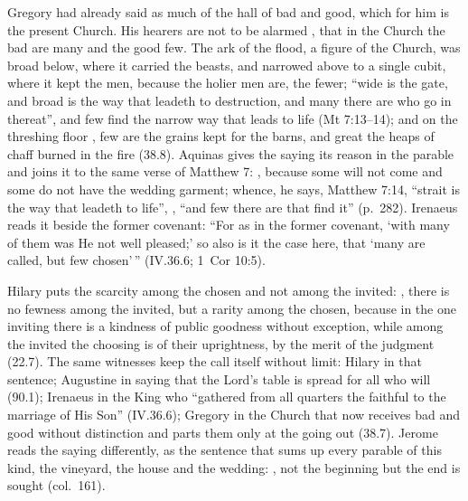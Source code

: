 Gregory had already said as much of the hall of bad and good, which for him is
the present Church. His hearers are not to be alarmed , that in the Church the bad are many and the
good few. The ark of the flood, a figure of the Church, was broad below, where
it carried the beasts, and narrowed above to a single cubit, where it kept the
men, because the holier men are, the fewer; ``wide is the gate, and broad is
the way that leadeth to destruction, and many there are who go in thereat'',
and few find the narrow way that leads to life (Mt 7:13--14); and on the
threshing floor , few are the grains kept for the barns,
and great the heaps of chaff burned in the fire (38.8). Aquinas gives the saying
its reason in the parable and joins it to the same verse of Matthew 7:
, because
some will not come and some do not have the wedding garment; whence, he says,
Matthew 7:14, ``strait is the way that leadeth to life'', , ``and few there are that find it'' (p.~282). Irenaeus reads it beside the
former covenant: ``For as in the former covenant, `with many of them was He not
well pleased;' so also is it the case here, that `many are called, but few
chosen'\,'' (IV.36.6; 1~Cor 10:5).

Hilary puts the scarcity among the chosen and not among the invited:
, there is no fewness among the
invited, but a rarity among the chosen, because in the one inviting there is a
kindness of public goodness without exception, while among the invited the
choosing is of their uprightness, by the merit of the judgment (22.7). The
same witnesses keep the call itself without limit: Hilary in that sentence;
Augustine in saying that the Lord's table is spread for all who will (90.1);
Irenaeus in the King who ``gathered from all quarters the faithful to the
marriage of His Son'' (IV.36.6); Gregory in the Church that now receives bad
and good without distinction and parts them only at the going out (38.7).
Jerome reads the saying differently, as the sentence that sums up every parable
of this kind, the vineyard, the house and the wedding: , not the beginning but the end is sought (col.~161).

